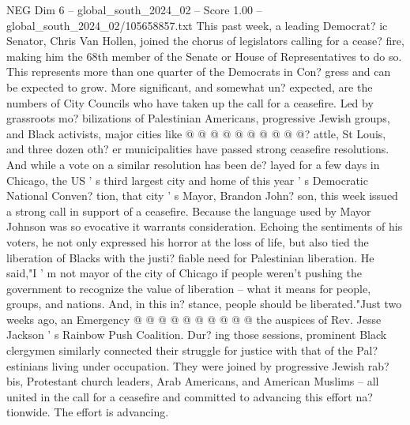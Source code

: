 \begin{textsample}{NEG Dim 6 – global\_south\_2024\_02 – Score 1.00 – global\_south\_2024\_02/105658857.txt}
This past week, a leading Democrat? ic Senator, Chris Van Hollen, joined the chorus of legislators calling for a cease? fire, making him the 68th member of the Senate or House of Representatives to do so.
This represents more than one quarter of the Democrats in Con? gress and can be expected to grow.
More significant, and somewhat un? expected, are the numbers of City Councils who have taken up the call for a ceasefire.
Led by grassroots mo? bilizations of Palestinian Americans, progressive Jewish groups, and Black activists, major cities like @ @ @ @ @ @ @ @ @ @? attle, St Louis, and three dozen oth? er municipalities have passed strong ceasefire resolutions.
And while a vote on a similar resolution has been de? layed for a few days in Chicago, the US ' s third largest city and home of this year ' s Democratic National Conven? tion, that city ' s Mayor, Brandon John? son, this week issued a strong call in support of a ceasefire.
Because the language used by Mayor Johnson was so evocative it warrants consideration.
Echoing the sentiments of his voters, he not only expressed his horror at the loss of life, but also tied the liberation of Blacks with the justi? fiable need for Palestinian liberation.
He said,"I ' m not mayor of the city of Chicago if people weren't pushing the government to recognize the value of liberation -- what it means for people, groups, and nations.
And, in this in? stance, people should be liberated."Just two weeks ago, an Emergency @ @ @ @ @ @ @ @ @ @ the auspices of Rev.
Jesse Jackson ' s Rainbow Push Coalition.
Dur? ing those sessions, prominent Black clergymen similarly connected their struggle for justice with that of the Pal? estinians living under occupation.
They were joined by progressive Jewish rab? bis, Protestant church leaders, Arab Americans, and American Muslims -- all united in the call for a ceasefire and committed to advancing this effort na? tionwide.
The effort is advancing.

\end{textsample}
